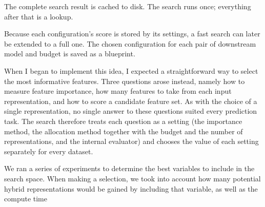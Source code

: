 The complete search result is cached to disk. The search runs once; everything after that is a lookup.

Because each configuration's score is stored by its settings, a fast search can later be extended to a full one. The chosen configuration for each pair of downstream model and budget is saved as a blueprint.

When I began to implement this idea, I expected a straightforward way to select the most informative features. Three questions arose instead, namely how to measure feature importance, how many features to take from each input representation, and how to score a candidate feature set. As with the choice of a single representation, no single answer to these questions suited every prediction task. The search therefore treats each question as a setting (the importance method, the allocation method together with the budget and the number of representations, and the internal evaluator) and chooses the value of each setting separately for every dataset.

We ran a series of experiments to determine the best variables to include in the search space.
When making a selection, we took into account how many potential hybrid representations would be gained by including that variable, as well as the compute time

